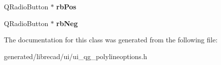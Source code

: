 \begin{DoxyCompactItemize}
\item 
\hypertarget{classUi__QG__PolylineOptions_acd88322ffe16c76d36d019435bc9a709}{Q\-Radio\-Button $\ast$ {\bfseries rb\-Pos}}\label{classUi__QG__PolylineOptions_acd88322ffe16c76d36d019435bc9a709}

\item 
\hypertarget{classUi__QG__PolylineOptions_a38712e1520e9e58640a18e80dd7db8e8}{Q\-Radio\-Button $\ast$ {\bfseries rb\-Neg}}\label{classUi__QG__PolylineOptions_a38712e1520e9e58640a18e80dd7db8e8}

\end{DoxyCompactItemize}


The documentation for this class was generated from the following file\-:\begin{DoxyCompactItemize}
\item 
generated/librecad/ui/ui\-\_\-qg\-\_\-polylineoptions.\-h\end{DoxyCompactItemize}
